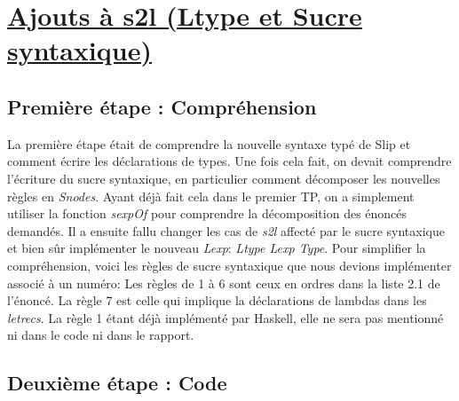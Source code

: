 \documentclass{article}
\begin{document}

\section{\underline{Ajouts à s2l (Ltype et Sucre syntaxique)}}

\subsection{Première étape : Compréhension}

La première étape était de comprendre la nouvelle syntaxe typé de Slip et comment écrire les déclarations de types. Une fois cela fait, on devait comprendre l'écriture du sucre syntaxique, en particulier comment décomposer les nouvelles règles en \textit{Snodes}. Ayant déjà fait cela dans le premier TP, on a simplement utiliser la fonction \textit{sexpOf} pour comprendre la décomposition des énoncés demandés. Il a ensuite fallu changer les cas de \textit{s2l} affecté par le sucre syntaxique et bien sûr implémenter le nouveau \textit{Lexp}:  \textit{Ltype Lexp Type}. Pour simplifier la compréhension, voici les règles de sucre syntaxique que nous devions implémenter associé à un numéro: Les règles de 1 à 6 sont ceux en ordres dans la liste 2.1 de l'énoncé. La règle 7 est celle qui implique la déclarations de lambdas dans les \textit{letrecs}. La règle 1 étant déjà implémenté par Haskell, elle ne sera pas mentionné ni dans le code ni dans le rapport.
 
\subsection{Deuxième étape : Code}
\end{document}

